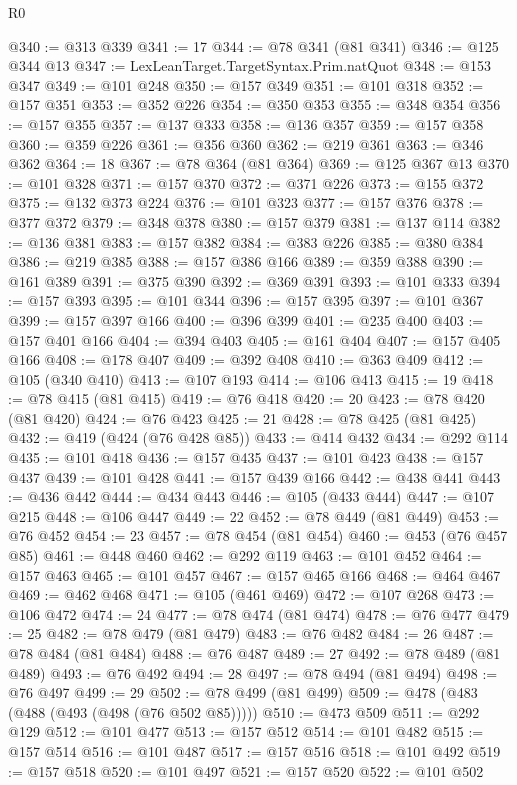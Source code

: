 \begin{lexlean}{R0}
\begin{coremodule}
@340 := @313 @339
@341 := 17
@344 := @78 @341 (@81 @341)
@346 := @125 @344 @13
@347 := LexLeanTarget.TargetSyntax.Prim.natQuot
@348 := @153 @347
@349 := @101 @248
@350 := @157 @349
@351 := @101 @318
@352 := @157 @351
@353 := @352 @226
@354 := @350 @353
@355 := @348 @354
@356 := @157 @355
@357 := @137 @333
@358 := @136 @357
@359 := @157 @358
@360 := @359 @226
@361 := @356 @360
@362 := @219 @361
@363 := @346 @362
@364 := 18
@367 := @78 @364 (@81 @364)
@369 := @125 @367 @13
@370 := @101 @328
@371 := @157 @370
@372 := @371 @226
@373 := @155 @372
@375 := @132 @373 @224
@376 := @101 @323
@377 := @157 @376
@378 := @377 @372
@379 := @348 @378
@380 := @157 @379
@381 := @137 @114
@382 := @136 @381
@383 := @157 @382
@384 := @383 @226
@385 := @380 @384
@386 := @219 @385
@388 := @157 @386 @166
@389 := @359 @388
@390 := @161 @389
@391 := @375 @390
@392 := @369 @391
@393 := @101 @333
@394 := @157 @393
@395 := @101 @344
@396 := @157 @395
@397 := @101 @367
@399 := @157 @397 @166
@400 := @396 @399
@401 := @235 @400
@403 := @157 @401 @166
@404 := @394 @403
@405 := @161 @404
@407 := @157 @405 @166
@408 := @178 @407
@409 := @392 @408
@410 := @363 @409
@412 := @105 (@340 @410)
@413 := @107 @193
@414 := @106 @413
@415 := 19
@418 := @78 @415 (@81 @415)
@419 := @76 @418
@420 := 20
@423 := @78 @420 (@81 @420)
@424 := @76 @423
@425 := 21
@428 := @78 @425 (@81 @425)
@432 := @419 (@424 (@76 @428 @85))
@433 := @414 @432
@434 := @292 @114
@435 := @101 @418
@436 := @157 @435
@437 := @101 @423
@438 := @157 @437
@439 := @101 @428
@441 := @157 @439 @166
@442 := @438 @441
@443 := @436 @442
@444 := @434 @443
@446 := @105 (@433 @444)
@447 := @107 @215
@448 := @106 @447
@449 := 22
@452 := @78 @449 (@81 @449)
@453 := @76 @452
@454 := 23
@457 := @78 @454 (@81 @454)
@460 := @453 (@76 @457 @85)
@461 := @448 @460
@462 := @292 @119
@463 := @101 @452
@464 := @157 @463
@465 := @101 @457
@467 := @157 @465 @166
@468 := @464 @467
@469 := @462 @468
@471 := @105 (@461 @469)
@472 := @107 @268
@473 := @106 @472
@474 := 24
@477 := @78 @474 (@81 @474)
@478 := @76 @477
@479 := 25
@482 := @78 @479 (@81 @479)
@483 := @76 @482
@484 := 26
@487 := @78 @484 (@81 @484)
@488 := @76 @487
@489 := 27
@492 := @78 @489 (@81 @489)
@493 := @76 @492
@494 := 28
@497 := @78 @494 (@81 @494)
@498 := @76 @497
@499 := 29
@502 := @78 @499 (@81 @499)
@509 := @478 (@483 (@488 (@493 (@498 (@76 @502 @85)))))
@510 := @473 @509
@511 := @292 @129
@512 := @101 @477
@513 := @157 @512
@514 := @101 @482
@515 := @157 @514
@516 := @101 @487
@517 := @157 @516
@518 := @101 @492
@519 := @157 @518
@520 := @101 @497
@521 := @157 @520
@522 := @101 @502

\end{coremodule}
\end{lexlean}
